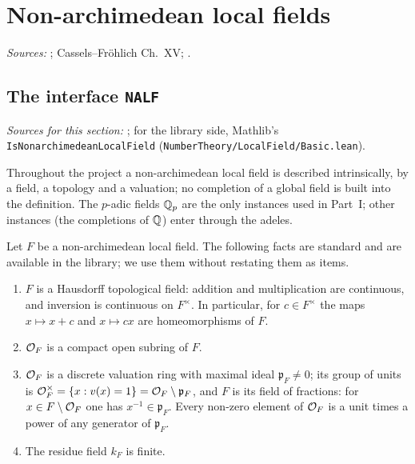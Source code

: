 
\chapter{Non-archimedean local fields}\label{ch:ch-0-02-local-field}

\noindent\emph{Sources:} \cite{Corv-ptIII-1}; Cassels--Fr\"ohlich Ch.~XV; \cite[§1]{Cas-p}.

\section{\texorpdfstring{The interface \texttt{NALF}}{The interface NALF}}\label{sec:lf-interface}

\noindent\emph{Sources for this section:} \cite[§1]{Corv-ptIII-1}; for the library side, Mathlib's
\texttt{IsNonarchimedean\allowbreak LocalField} (\texttt{NumberTheory/\allowbreak LocalField/\allowbreak Basic.lean}).

Throughout the project a non-archimedean local field is described intrinsically, by a field, a topology and a
valuation; no completion of a global field is built into the definition. The $p$-adic fields $\mathbb{Q}_p$ are the only
instances used in Part~I; other instances (the completions of $\mathbb{Q}$) enter through the adeles.

\begin{definition}
\end{definition}

\begin{remark}\label{rem:lf-standard-facts}
Let $F$ be a non-archimedean local field. The following facts are standard \cite[§1]{Corv-ptIII-1} and are
available in the library; we use them without restating them as items.
\begin{enumerate}[label=(\alph*)]
\item\label{lf-fact-topfield} $F$ is a Hausdorff topological field: addition and multiplication are continuous, and
  inversion is continuous on $F^\times$. In particular, for $c\in F^\times$ the maps $x\mapsto x+c$ and $x\mapsto cx$
  are homeomorphisms of $F$.
\item\label{lf-fact-compact} $\mathcal{O}_F$ is a compact open subring of $F$.
\item\label{lf-fact-dvr} $\mathcal{O}_F$ is a discrete valuation ring with maximal ideal $\mathfrak p_F\neq0$; its group of
  units is $\mathcal{O}_F^\times=\{x:v(x)=1\}=\mathcal{O}_F\setminus\mathfrak p_F$, and $F$ is its field of fractions: for
  $x\in F\setminus\mathcal{O}_F$ one has $x^{-1}\in\mathfrak p_F$. Every non-zero element of $\mathcal{O}_F$ is a unit times a
  power of any generator of $\mathfrak p_F$.
\item\label{lf-fact-finite} The residue field $k_F$ is finite.
\end{enumerate}
\end{remark}

